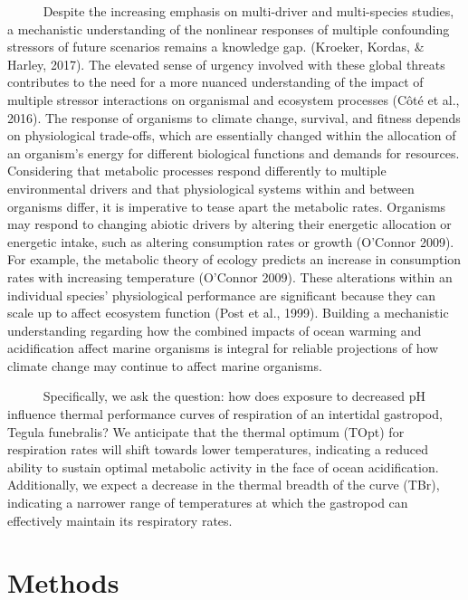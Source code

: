 \documentclass[
  12pt,
]{article}
\begin{document}
~~~~~ Despite the increasing emphasis on multi-driver and multi-species
studies, a mechanistic understanding of the nonlinear responses of
multiple confounding stressors of future scenarios remains a knowledge
gap. (Kroeker, Kordas, \& Harley, 2017). The elevated sense of urgency
involved with these global threats contributes to the need for a more
nuanced understanding of the impact of multiple stressor interactions on
organismal and ecosystem processes (Côté et al., 2016). The response of
organisms to climate change, survival, and fitness depends on
physiological trade-offs, which are essentially changed within the
allocation of an organism's energy for different biological functions
and demands for resources. Considering that metabolic processes respond
differently to multiple environmental drivers and that physiological
systems within and between organisms differ, it is imperative to tease
apart the metabolic rates. Organisms may respond to changing abiotic
drivers by altering their energetic allocation or energetic intake, such
as altering consumption rates or growth (O'Connor 2009). For example,
the metabolic theory of ecology predicts an increase in consumption
rates with increasing temperature (O'Connor 2009). These alterations
within an individual species' physiological performance are significant
because they can scale up to affect ecosystem function (Post et al.,
1999). Building a mechanistic understanding regarding how the combined
impacts of ocean warming and acidification affect marine organisms is
integral for reliable projections of how climate change may continue to
affect marine organisms.

~~~~~ Specifically, we ask the question: how does exposure to decreased
pH influence thermal performance curves of respiration of an intertidal
gastropod, Tegula funebralis? We anticipate that the thermal optimum
(TOpt) for respiration rates will shift towards lower temperatures,
indicating a reduced ability to sustain optimal metabolic activity in
the face of ocean acidification. Additionally, we expect a decrease in
the thermal breadth of the curve (TBr), indicating a narrower range of
temperatures at which the gastropod can effectively maintain its
respiratory rates.

\newpage

\hypertarget{methods}{%
\section{Methods}\label{methods}}
\end{document}

